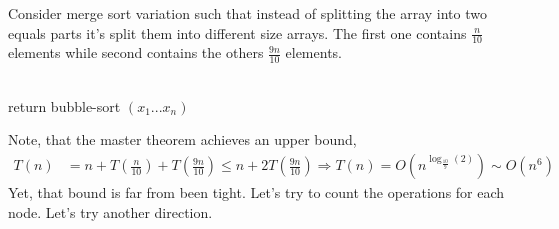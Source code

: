 \begin{example}
Consider merge sort variation such that instead of splitting the array into two equals parts it's split them into different size arrays. The first one contains \( \frac{n}{10} \) elements while second contains the others \( \frac{9n}{10}\) elements.

\begin{algorithm}
\SetAlgoLined
{}
 \ \\ 
    { return bubble-sort \( (x_1 ... x_n)\) } 
 \ \\ 
 
\end{algorithm}
Note, that the master theorem achieves an upper bound, 
\begin{equation*}
    \begin{split}
        T\left(n\right) & = n +  T\left(\frac{n}{10}\right) + T\left(\frac{9n}{10}\right) \le n +  2 T\left(\frac{9n}{10}\right) \Rightarrow T\left(n\right) = O \left( n^{\log_{\frac{10}{9}}\left(2\right)} \right) \sim O \left( n^{ 6 } \right)  
    \end{split}
\end{equation*}
Yet, that bound is far from been tight. Let's try to count the operations for each node. Let's try another direction. 


\end{example}

